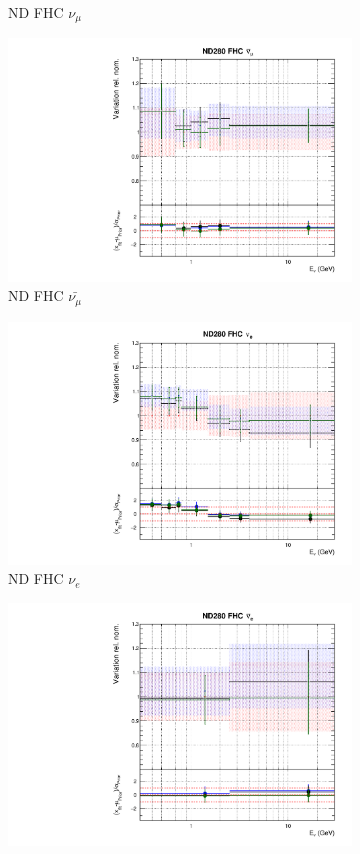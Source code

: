 \begin{figure}
\begin{subfigure}{0.45\textwidth}
  \caption{ND FHC $\nu_{\mu}$}  
\end{subfigure}
\begin{subfigure}{0.45\textwidth}
  \centering
  \includegraphics[width=0.75\linewidth]{figs/fgdfitsflux_1}
  \caption{ND FHC $\bar{\nu_{\mu}}$}
\end{subfigure}
\begin{subfigure}{0.45\textwidth}
  \centering
  \includegraphics[width=0.75\linewidth]{figs/fgdfitsflux_2}
  \caption{ND FHC $\nu_e$}
\end{subfigure}
\begin{subfigure}{0.45\textwidth}
  \centering
  \includegraphics[width=0.75\linewidth]{figs/fgdfitsflux_3}

\end{subfigure}
\end{figure}
